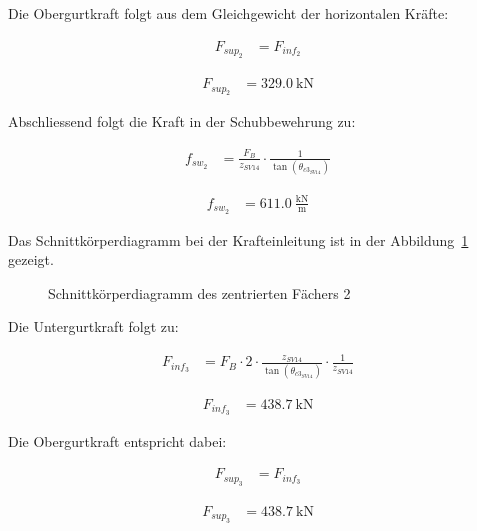 \documentclass[
  11pt,
  letterpaper,
]{scrreprt}
\begin{document}
Die Obergurtkraft folgt aus dem Gleichgewicht der horizontalen Kräfte:

$$
\begin{aligned}
F_{sup_{2}} &= F_{inf_{2}} \; 
\end{aligned}
$$

$$
\begin{aligned}
F_{sup_{2}} &= 329.0\ \mathrm{kN} \; 
\end{aligned}
$$

Abschliessend folgt die Kraft in der Schubbewehrung zu:

$$
\begin{aligned}
f_{sw_{2}} &= \frac{ F_{B} }{ z_{SV14} } \cdot \frac{1} { \tan \left( \theta_{c3_{SV14}} \right) } \; 
\end{aligned}
$$

$$
\begin{aligned}
f_{sw_{2}} &= 611.0\ \frac{\mathrm{kN}}{\mathrm{m}} \;
\end{aligned}
$$

Das Schnittkörperdiagramm bei der Krafteinleitung ist in der
Abbildung~\ref{fig-skd_3_spannungsfelder_sv14} gezeigt.

\begin{figure}[H]


\caption{\label{fig-skd_3_spannungsfelder_sv14}Schnittkörperdiagramm des
zentrierten Fächers 2}

\end{figure}%

Die Untergurtkraft folgt zu:

$$
\begin{aligned}
F_{inf_{3}} &= F_{B} \cdot 2 \cdot \frac{ z_{SV14} }{ \tan \left( \theta_{c3_{SV14}} \right) } \cdot \frac{1} { z_{SV14} } \; 
\end{aligned}
$$

$$
\begin{aligned}
F_{inf_{3}} &= 438.7\ \mathrm{kN} \;
\end{aligned}
$$

Die Obergurtkraft entspricht dabei:

$$
\begin{aligned}
F_{sup_{3}} &= F_{inf_{3}} \; 
\end{aligned}
$$

$$
\begin{aligned}
F_{sup_{3}} &= 438.7\ \mathrm{kN} \;
\end{aligned}
$$
\end{document}
